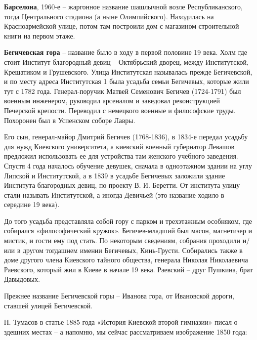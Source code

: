 \medskip

\textbf{Барселона}, 1960-е – жаргонное название шашлычной возле Республиканского, тогда Центрального стадиона (а ныне Олимпийского). Находилась на Красноармейской улице, потом там построили дом с магазином строительной книги на первом этаже.\\

\medskip


\textbf{Бегичевская гора} – название было в ходу в первой половине 19 века. Холм где стоит Институт благородный девиц – Октябрьский дворец, между Институтской, Крещатиком и Грушевского. Улица Институтская называлась прежде Бегичевской, и по месту адреса Институтская 1 была усадьба семьи Бегичевых, которые жили тут с 1782 года. Генерал-поручик Матвей Семенович Бегичев (1724-1791) был военным инженером, руководил арсеналом и заведовал реконструкцией Печерской крепости. Переводил с немецкого военные и философские труды. Похоронен был в Успенском соборе Лавры.

Его сын, генерал-майор Дмитрий Бегичев (1768-1836), в 1834-е передал усадьбу для нужд Киевского университета, а киевский военный губернатор Левашов предложил использовать ее для устройства там женского учебного заведения. Спустя 4 года началось обучение девушек, сначала в одноэтажном здании на углу Липской и Институтской, а в 1839 в усадьбе Бегичевых заложили здание Института благородных девиц, по проекту  В. И. Беретти. От института улицу стали называть Институтской, а иногда Девичьей (это название ходило в середине 19 века).

До того усадьба представляла собой гору с парком и трехэтажным особняком, где собирался «философический кружок». Бегичев-младший был масон, магнетизер и мистик, и гости ему под стать. По некоторым сведениям, собрания проходили и/или в другом тогдашнем имении Бегичевых, Кинь-Грусти. Собирались также в доме другого члена Киевского тайного общества, генерала Николая Николаевича Раевского, который жил в Киеве в начале 19 века. Раевский – друг Пушкина, брат Давыдовых.

Прежнее название Бегичевской горы – Иванова гора, от Ивановской дороги, ставшей улицей Бегичевской.

Н. Тумасов в статье 1885 года «История Киевской второй гимназии» писал о здешних местах – а напомню, мы сейчас рассматриваем изображение 1850 года:

